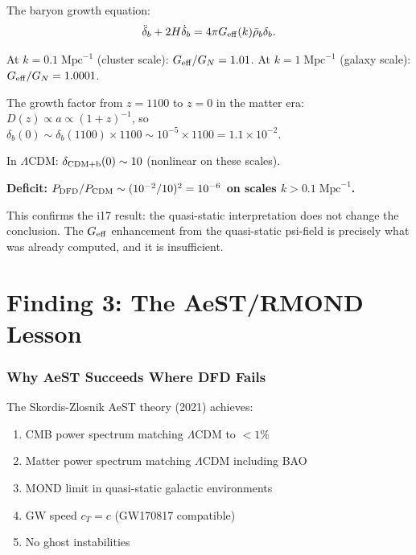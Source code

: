 \documentclass[11pt]{article}
\newcommand{\ee}[1]{\times 10^{#1}}
\newcommand{\LCDM}{$\Lambda$CDM}
\newcommand{\Geff}{G_{\rm eff}}
\begin{document}
The baryon growth equation:
\begin{equation}
\ddot\delta_b + 2H\dot\delta_b = 4\pi \Geff(k) \bar\rho_b \delta_b.
\end{equation}

At $k = 0.1\;\text{Mpc}^{-1}$ (cluster scale): $\Geff/G_N = 1.01$.
At $k = 1\;\text{Mpc}^{-1}$ (galaxy scale): $\Geff/G_N = 1.0001$.

The growth factor from $z = 1100$ to $z = 0$ in the matter era:
$D(z) \propto a \propto (1+z)^{-1}$, so
$\delta_b(0) \sim \delta_b(1100) \times 1100 \sim 10^{-5} \times 1100
= 1.1\ee{-2}$.

In \LCDM: $\delta_{\rm CDM+b}(0) \sim 10$ (nonlinear on these scales).

\textbf{Deficit: $P_{\rm DFD}/P_{\rm CDM} \sim (10^{-2}/10)^2 = 10^{-6}$
on scales $k > 0.1\;\text{Mpc}^{-1}$.}

This confirms the i17 result: the quasi-static interpretation does
not change the conclusion. The $\Geff$ enhancement from the quasi-static
psi-field is precisely what was already computed, and it is insufficient.


\part{Finding 3: The AeST/RMOND Lesson}
\label{part:AeST}

\section{Why AeST Succeeds Where DFD Fails}

The Skordis-Zlosnik AeST theory (2021) achieves:
\begin{enumerate}[nosep]
\item CMB power spectrum matching \LCDM{} to $<1\%$
\item Matter power spectrum matching \LCDM{} including BAO
\item MOND limit in quasi-static galactic environments
\item GW speed $c_T = c$ (GW170817 compatible)
\item No ghost instabilities
\end{enumerate}
\end{document}
